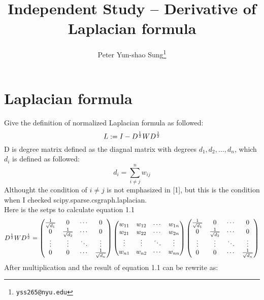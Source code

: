 \documentclass[final]{siamltexmm}
\title{Independent Study -- Derivative of Laplacian formula}
\author{Peter Yun-shao Sung\thanks{\tt yss265@nyu.edu} }
\begin{document}
\maketitle

\pagestyle{myheadings}
\thispagestyle{plain}

\section{Laplacian formula}
Give the definition of normalized Laplacian formula as followed:
\begin{equation}
L := I - D^{1 \over 2}W D^{1 \over 2}
\end{equation}
D is degree matrix defined as the diagnal matrix with degrees $d_1, d_2, \ldots, d_n$, which $d_i$ is defined as followed:
\begin{equation}
d_i = \displaystyle\sum_{i \neq j}^{n} w_{ij}
\end{equation}
Althought the condition of $i \neq j$ is not emphasized in [1], but this is the condition when I checked scipy.sparse.csgraph.laplacian.\\
Here is the setps to calculate equation 1.1
\begin{equation}
D^{1 \over 2}W D^{1 \over 2} =
\begin{pmatrix}
  {1 \over \sqrt{d_1}} & 0 & \cdots & 0 \\
  0 & {1 \over \sqrt{d_2}} & \cdots & 0 \\
  \vdots  & \vdots  & \ddots & \vdots  \\
  0 & 0 & \cdots & {1 \over \sqrt{d_n}}
\end{pmatrix}
\begin{pmatrix}
  w_{11} & w_{12} & \cdots & w_{1n} \\
  w_{21} & w_{22} & \cdots & w_{2n} \\
  \vdots  & \vdots  & \ddots & \vdots  \\
  w_{n1} & w_{n2} & \cdots & w_{nn}
\end{pmatrix}
\begin{pmatrix}
  {1 \over \sqrt{d_1}} & 0 & \cdots & 0 \\
  0 & {1 \over \sqrt{d_2}} & \cdots & 0 \\
  \vdots  & \vdots  & \ddots & \vdots  \\
  0 & 0 & \cdots & {1 \over \sqrt{d_n}}
\end{pmatrix}
\end{equation}
After multiplication and the result of equation 1.1 can be rewrite as:
\end{document}
